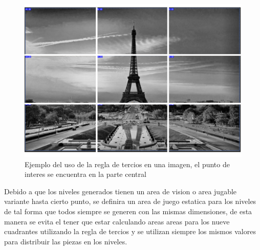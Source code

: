 \begin{figure}
  \centering
  \includegraphics[width=1.0\textwidth]{img/ruleofthirds_example.png}
  \caption{Ejemplo del uso de la regla de tercios en una imagen, el punto de interes se encuentra en la parte central}
  \label{figure:ruleofthirdsexample}
\end{figure}

Debido a que los niveles generados tienen un area de vision o area jugable
variante hasta cierto punto, se definira un area de juego estatica para los
niveles de tal forma que todos siempre se generen con las mismas dimensiones, de
esta manera se evita el tener que estar calculando areas areas para los nueve
cuadrantes utilizando la regla de tercios y se utilizan siempre los mismos
valores para distribuir las piezas en los niveles.

